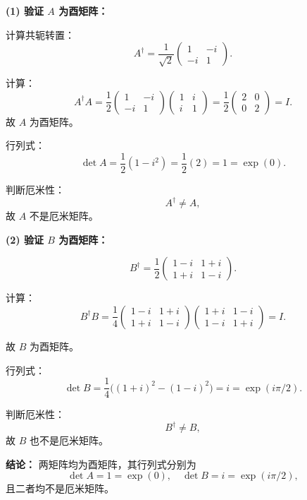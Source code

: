 \begin{solution}[酉矩阵与行列式的指数形式]

\answer

\textbf{(1) 验证 $A$ 为酉矩阵：}

计算共轭转置：
\[
A^\dagger=\frac{1}{\sqrt{2}}\begin{pmatrix}1&-i\\ -i&1\end{pmatrix}.
\]

计算：
\[
A^\dagger A=\frac{1}{2}
\begin{pmatrix}1&-i\\ -i&1\end{pmatrix}
\begin{pmatrix}1&i\\ i&1\end{pmatrix}
=
\frac{1}{2}\begin{pmatrix}2&0\\ 0&2\end{pmatrix}=I.
\]
故 $A$ 为酉矩阵。

行列式：
\[
\det A=\frac{1}{2}(1-i^2)=\frac{1}{2}(2)=1=\exp(0).
\]

判断厄米性：
\[
A^\dagger \neq A,
\]
故 $A$ 不是厄米矩阵。

\textbf{(2) 验证 $B$ 为酉矩阵：}

\[
B^\dagger=\frac{1}{2}
\begin{pmatrix}
1-i & 1+i\\
1+i & 1-i
\end{pmatrix}.
\]

计算：
\[
B^\dagger B
=\frac{1}{4}
\begin{pmatrix}
1-i & 1+i\\
1+i & 1-i
\end{pmatrix}
\begin{pmatrix}
1+i & 1-i\\
1-i & 1+i
\end{pmatrix}
=I.
\]

故 $B$ 为酉矩阵。

行列式：
\[
\det B=\frac{1}{4}\big((1+i)^2-(1-i)^2\big)
= i = \exp(i\pi/2).
\]

判断厄米性：
\[
B^\dagger \neq B,
\]
故 $B$ 也不是厄米矩阵。

\textbf{结论：}
两矩阵均为酉矩阵，其行列式分别为
\[
\det A=1=\exp(0),\quad \det B=i=\exp(i\pi/2),
\]
且二者均不是厄米矩阵。
\end{solution}
